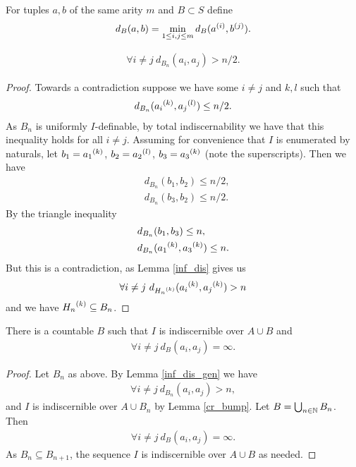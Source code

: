 \begin{Definition}
  For tuples $a,b$ of the same arity $m$ and $B \subset S$ define
  \begin{align*}
    d_B(a,b) = \min_{1 \leq i,j \leq m} d_B({a}^{(i)}, {b}^{(j)}).
  \end{align*}
\end{Definition}

\begin{Lemma} \label{inf_dis_gen}
  \begin{align*}
    \forall i \neq j \ d_{B_n}(a_i, a_j) > n/2.
  \end{align*}
\end{Lemma}

\begin{proof}
  Towards a contradiction suppose we have some $i \neq j$ and $k, l$ such that
  \begin{align*}
    d_{B_n}({a_i}^{(k)}, {a_j}^{(l)}) \leq n/2.
  \end{align*}
  As $B_n$ is uniformly $I$-definable, by total indiscernability we have that this inequality holds for all $i \neq j$.
  Assuming for convenience that $I$ is enumerated by naturals, let $b_1 = {a_1}^{(k)}$, $b_2 = {a_2}^{(l)}$, $b_3 = {a_3}^{(k)}$
  (note the superscripts).
  Then we have
  \begin{align*}
    &d_{B_n}(b_1, b_2) \leq n/2, \\
    &d_{B_n}(b_3, b_2) \leq n/2.
  \end{align*}
  By the triangle inequality
  \begin{align*}
    &d_{B_n}(b_1, b_3) \leq n, \\
    &d_{B_n}({a_1}^{(k)}, {a_3}^{(k)}) \leq n.
  \end{align*}
  But this is a contradiction, as Lemma \ref{inf_dis} gives us
  \begin{align*}
    \forall i \neq j \ d_{{H_n}^{(k)}}({a_i}^{(k)}, {a_j}^{(k)}) > n
  \end{align*}
  and we have ${H_n}^{(k)} \subseteq B_n$.
\end{proof}

\begin{Corollary} \label{inf_dis}
  There is a countable $B$ such that $I$ is indiscernible over $A \cup B$ and
  \begin{align*}
    \forall i \neq j \ d_B(a_i, a_j) = \infty.
  \end{align*}
\end{Corollary}

\begin{proof}
  Let $B_n$ as above. By Lemma \ref{inf_dis_gen} we have 
  \begin{align*}
    \forall i \neq j \ d_{B_n}(a_i, a_j) > n,
  \end{align*}
  and $I$ is indiscernible over $A \cup B_n$ by Lemma \ref{cr_bump}.
  Let $B = \bigcup_{n \in \mathbb{N}} B_n$.
  Then
  \begin{align*}
    \forall i \neq j \ d_{B}(a_i, a_j) = \infty.
  \end{align*}
  As $B_n \subseteq B_{n+1}$, the sequence $I$ is indiscernible over $A \cup B$ as needed.
\end{proof}

